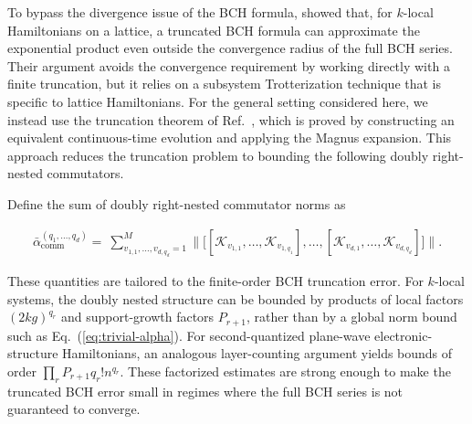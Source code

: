 \documentclass[aps,pra,reprint,groupedaddress,floatfix]{revtex4-2}
\newcommand{\eq}[1]{(\ref{eq:#1})}
\renewcommand{\comm}{\mathrm{comm}}
\newcommand{\mc}{\mathcal}
\newcommand{\xz}[1]{{\color{cyan} XZ: #1}}
\newcommand{\sz}[1]{{\color{blue} Shuo: #1}}
\begin{document}
To bypass the divergence issue of the BCH formula, \citet{mizuta2025commutator} showed that, for $k$-local Hamiltonians on a lattice, a truncated BCH formula can approximate the exponential product even outside the convergence radius of the full BCH series. Their argument avoids the convergence requirement by working directly with a finite truncation, but it relies on a subsystem Trotterization technique that is specific to lattice Hamiltonians. For the general setting considered here, we instead use the truncation theorem of Ref.~\cite{wang2026lindbladiansimulationcommutatorbounds}, which is proved by constructing an equivalent continuous-time evolution and applying the Magnus expansion. This approach reduces the truncation problem to bounding the following doubly right-nested commutators.

Define the sum of doubly right-nested commutator norms as
\begin{widetext}
\begin{align}
\label{eq:def-beta-bar-general}
    \bar{\alpha}_{\comm}^{(q_1, \ldots, q_{d})}
    =~ 
    \sum_{v_{1,1}, \ldots, v_{d, q_{d}} = 1}^M \bigg\| \Big[ 
         [\mc K_{v_{1,1}}, \ldots, \mc K_{v_{1,q_1}}], \ldots, 
        [\mc K_{v_{d,1}}, \ldots, \mc K_{v_{d,q_{d}}}]
	     \Big] \bigg\|.
\end{align}
\end{widetext}
These quantities are tailored to the finite-order BCH truncation error. For $k$-local systems, the doubly nested structure can be bounded by products of local factors $(2kg)^{q_r}$ and support-growth factors $P_{r+1}$, rather than by a global norm bound such as Eq.~\eq{trivial-alpha}. For second-quantized plane-wave electronic-structure Hamiltonians, an analogous layer-counting argument yields bounds of order $\prod_r P_{r+1}q_r!n^{q_r}$. These factorized estimates are strong enough to make the truncated BCH error small in regimes where the full BCH series is not guaranteed to converge.
\end{document}

